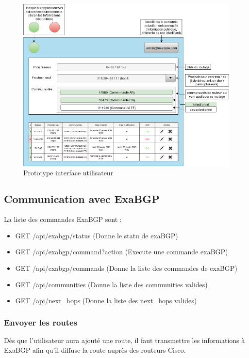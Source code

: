 \begin{figure}[H]
    \includegraphics[width=\textwidth]{./medias/ui_interface.png}
    \caption{Prototype interface utilisateur}
    \label{fig:ui_interfaces}
\end{figure}


\subsection{Communication avec ExaBGP}
\noindent
La liste des commandes ExaBGP sont :
\begin{itemize}
    \item GET /api/exabgp/status (Donne le statu de exaBGP)
    \item GET /api/exabgp/command{?action} (Execute une commande exaBGP)
    \item GET /api/exabgp/commands (Donne la liste des commandes de exaBGP)
    \item GET /api/communities (Donne la liste des communities valides)
    \item GET /api/next\_hops (Donne la liste des next\_hops valides)

\end{itemize}

\subsubsection{Envoyer les routes}
Dès que l'utilisateur aura ajouté une route, il faut transmettre les informations à ExaBGP afin qu'il diffuse la route auprès des routeurs Cisco.

